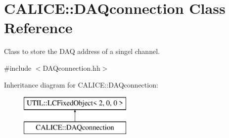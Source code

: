 \section{C\-A\-L\-I\-C\-E\-:\-:D\-A\-Qconnection Class Reference}
\label{classCALICE_1_1DAQconnection}


Class to store the D\-A\-Q address of a singel channel.  




{\ttfamily \#include $<$D\-A\-Qconnection.\-hh$>$}

Inheritance diagram for C\-A\-L\-I\-C\-E\-:\-:D\-A\-Qconnection\-:\begin{figure}[H]
\begin{center}
\leavevmode
\includegraphics[height=2.000000cm]{classCALICE_1_1DAQconnection}
\end{center}
\end{figure}
